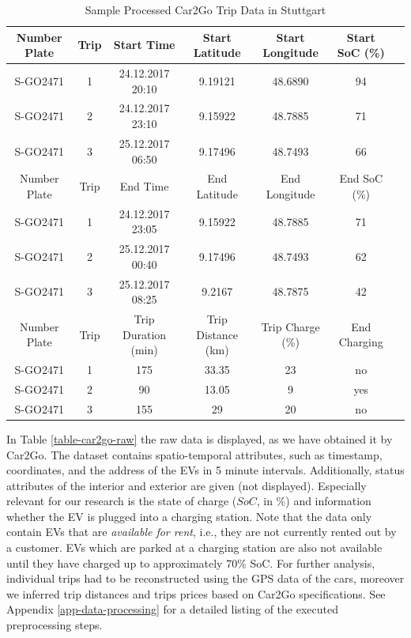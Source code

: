 \documentclass[a4paper, 12pt]{article}
\begin{document}
\begin{table}
    \caption{Sample Processed Car2Go Trip Data in Stuttgart \label{table-car2go-processed}}
    \centering
    \begin{tabular}{cc|ccccc}
      \hline
      \hline
      Number Plate & Trip & Start Time & Start Latitude & Start Longitude & Start SoC (\%)\\
      \hline
      S-GO2471 & 1 & 24.12.2017 20:10 & 9.19121 & 48.6890 & 94\\
      S-GO2471 & 2 & 24.12.2017 23:10 & 9.15922 & 48.7885 & 71\\
      S-GO2471 & 3 & 25.12.2017 06:50 & 9.17496 & 48.7493 & 66\\
      \hline
      Number Plate & Trip & End Time & End Latitude & End Longitude & End SoC (\%)\\
      \hline
      S-GO2471 & 1 & 24.12.2017 23:05 & 9.15922 & 48.7885 & 71\\
      S-GO2471 & 2 & 25.12.2017 00:40 & 9.17496 & 48.7493 & 62\\
      S-GO2471 & 3 & 25.12.2017 08:25 & 9.2167 & 48.7875 & 42\\
      \hline
      Number Plate & Trip & Trip Duration (min) & Trip Distance (km) & Trip Charge (\%) & End Charging\\
      \hline
      S-GO2471 & 1 & 175 & 33.35 & 23 & no\\
      S-GO2471 & 2 & 90 & 13.05 & 9 & yes\\
      S-GO2471 & 3 & 155 & 29 & 20 & no\\
      \hline
      \hline
    \end{tabular}
\end{table}

In Table \ref{table-car2go-raw} the raw data is displayed, as we have obtained it
by Car2Go. The dataset contains spatio-temporal attributes, such as timestamp,
coordinates, and the address of the EVs in 5 minute intervals. Additionally,
status attributes of the interior and exterior are given (not displayed).
Especially relevant for our research is the state of charge (\(SoC\), in \%) and
information whether the EV is plugged into a charging station. Note that the
data only contain EVs that are \emph{available for rent}, i.e., they are not
currently rented out by a customer. EVs which are parked at a charging station
are also not available until they have charged up to approximately 70\% SoC. For
further analysis, individual trips had to be reconstructed using the GPS data of
the cars, moreover we inferred trip distances and trips prices based on Car2Go
specifications. See Appendix \ref{app-data-processing} for a detailed listing of
the executed preprocessing steps.
\end{document}
